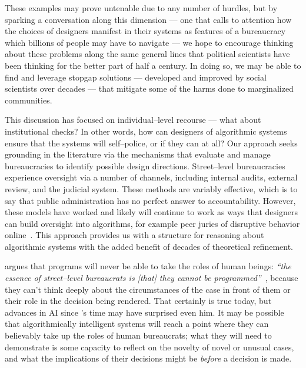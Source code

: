 \documentclass[main]{subfiles}
\begin{document}
These examples may prove untenable due to any number of hurdles, but
by sparking a conversation along this dimension
--- one that calls to attention how
the choices of designers manifest in their systems as
features of a bureaucracy which billions of people may have to navigate ---
we hope to encourage thinking about these problems
along the same general lines that
political scientists have been thinking for the better part of half a century.
In doing so, we may be able to find and leverage stopgap solutions
--- developed and improved by social scientists over decades ---
that mitigate some of the harms done to marginalized communities.

This discussion has focused on individual--level recourse --- what about institutional checks?
In other words, how can designers of algorithmic systems ensure that the systems will self--police, or if they can at all?
Our approach seeks grounding in the literature via the mechanisms that evaluate and manage bureaucracies to identify possible design directions.
Street--level bureaucracies experience oversight via a number of channels, including internal audits, external review, and the judicial system.
These methods are variably effective, which is to say that public administration has no perfect answer to accountability.
However, these models have worked and likely will continue to work
as ways that designers can build oversight into algorithms,
for example peer juries of disruptive behavior online~\cite{Kou:2017:MDB:3171581.3134697}.
This approach provides us with a structure for reasoning about algorithmic systems with the added benefit of decades of theoretical refinement.


\citeauthor{lipsky1983street} argues that programs will never be able to take the roles of human beings:
\textit{``the essence of street--level bureaucrats is [that] they cannot be programmed''}~\cite{lipsky1983street},
because they can't think deeply about the circumstances of the case in front of them or their role in the decision being rendered.
That certainly is true today, but advances in AI since \citeauthor{lipsky1983street}'s time may have surprised even him.
It may be possible that algorithmically intelligent systems will reach a point where they can believably take up the roles of human bureaucrats;
what they will need to demonstrate is some capacity to reflect on the novelty of novel or unusual cases, and
what the implications of their decisions might be \textit{before} a decision is made.


\onlyinsubfile{
  
  
}
\end{document}
